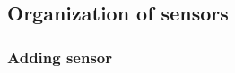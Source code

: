 \documentclass[12pt]{article}
\newcommand{\prio}[1]{\ifthenelse{\equal{#1}{1}}{low}{\ifthenelse{\equal{#1}{2}}{medium}{\ifthenelse{\equal{#1}{3}}{high}{\textbf{INVALID!}}}}\relax}
\newcounter{fr}
\newcommand{\fr}[8]{
\refstepcounter{fr}\label{#8}
\begin{tabularx}{16cm}{l|X}
 & \textbf{#1} \hfill \textbf{FR\arabic{fr}} \\ \hline
Description & #2\\ \hline
\ifthenelse{\equal{#3}{}}{}{Precondition & #3 \\ \hline}
\ifthenelse{\equal{#4}{}}{}{Postcondition & #4 \\ \hline}
Rationale & #5
\ifthenelse{\equal{#6}{}}{}{\\ \hline Dependencies & #6} 
\ifthenelse{\equal{#7}{}}{}{ \\ \hline Priority & \prio{#7}}
\end{tabularx}
\vspace*{0.75cm}
}
\newcommand{\frref}[1]{FR\ref{#1}\textsuperscript{$\rightarrow$ p. \pageref{#1}}}
\begin{document}





\subsection{Organization of sensors}
\label{ssec:Organization of sensors}
\subsubsection{Adding sensor}
\end{document}
